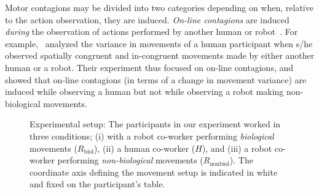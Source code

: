 \documentclass[a4paper, 12pt, oneside]{Thesis}  %
\begin{document}
Motor contagions may be divided into two categories depending on when, relative to the action observation, they are induced. \emph{On-line contagions} are induced \emph{during} the observation of actions performed by another human or robot~\cite{Kupferberg:Methods:2009, Oztop:RAS_ICHR:2004, Chaminade:JPP:2009, Kupferberg:PlosOne:2012, Brass:ActaPsych:2001, Press:CBR:2005}. For example,~\cite{Kilner:CurBio:2003} analyzed the variance in movements of a human participant when s/he observed spatially congruent and in-congruent movements made by either another human or a robot. Their experiment thus focused on on-line contagions, and showed that on-line contagions (in terms of a change in movement variance) are induced while observing a human but not while observing a robot making non-biological movements.

\begin{figure}[t]
	\caption{Experimental setup: The participants in our experiment worked in three conditions; (i) with a robot co-worker performing \textit{biological} movements ($\textit{R}_{\text{biol}}$), (ii) a human co-worker ($\textit{H}$), and (iii) a robot co-worker performing \textit{non-biological} movements ($\textit{R}_{\text{nonbiol}}$). The coordinate axis defining the movement setup is indicated in white and fixed on the participant's table.}
	\label{fig:setup}
\end{figure}
\end{document}
